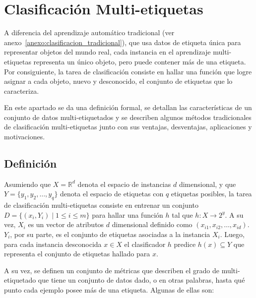 \section{Clasificación Multi-etiquetas}

A diferencia del aprendizaje automático tradicional (ver
anexo~\ref{anexo:clasificacion_tradicional}), que usa datos de etiqueta única
para representar objetos del mundo real, cada instancia en el aprendizaje
multi-etiquetas representa un único objeto, pero puede contener más de una
etiqueta. Por consiguiente, la tarea de clasificación consiste en hallar una
función que logre asignar a cada objeto, nuevo y desconocido, el conjunto de
etiquetas que lo caracteriza.

En este apartado se da una definición formal, se detallan las características de
un conjunto de datos multi-etiquetados y se  describen algunos métodos
tradicionales de clasificación multi-etiquetas junto con sus ventajas,
desventajas, aplicaciones y motivaciones.

\subsection{Definición}
\label{mll_def_formal}

Asumiendo que $X=\mathbb{R}^{d}$ denota el espacio de instancias $d$
dimensional, y que $Y = \{y_{1}, y_{2}, \dots, y_{q}\}$ denota el espacio de
etiquetas con $q$ etiquetas posibles, la tarea de clasificación multi-etiquetas
consiste en entrenar un conjunto $D = \{(x_{i}, Y_{i}) \mid 1 \leq i \leq m\}$
para hallar una función $h$ tal que $h: X \rightarrow 2^y$. A su vez, $X_{i}$ es
un vector de atributos $d$ dimensional definido como $(x_{i1}, x_{i2}, \dots,
	x_{id})$. $Y_{i}$, por su parte, es el conjunto de etiquetas asociadas a la
instancia $X_{i}$. Luego, para cada instancia desconocida $x \in X$ el
clasificador $h$ predice $h(x) \subseteq Y$ que representa el conjunto de
etiquetas hallado para $x$.

A su vez, se definen un conjunto de métricas que describen el grado de
multi-etiquetado que tiene un conjunto de datos dado, o en otras palabras, hasta
qué punto cada ejemplo posee más de una etiqueta. Algunas de ellas son:


